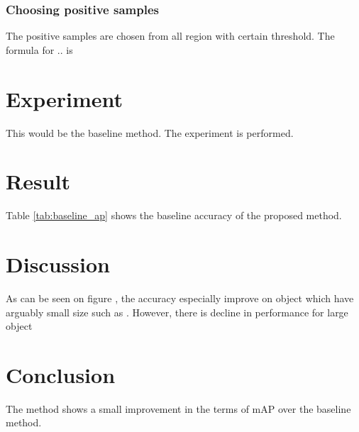 \documentclass[a4paper]{article}
\begin{document}
\subsubsection{Choosing positive samples}
The positive samples are chosen from all region with certain threshold. The formula for .. is

\section{Experiment}
This would be the baseline method.
The experiment is performed.

\section{Result}
Table \ref{tab:baseline_ap} shows the baseline accuracy of the proposed method.

\section{Discussion}

As can be seen on figure , the accuracy especially improve on object which have arguably small size such as . However, there is decline in performance for large object

\section{Conclusion}
The method shows a small improvement in the terms of mAP over the baseline method.



\end{document}
